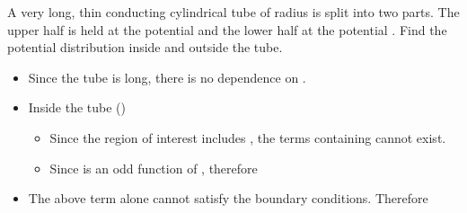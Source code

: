 \begin{ELexample}{}

A very long, thin conducting cylindrical tube of radius  is split into two parts. The upper half is held at the potential  and the lower half at the potential . Find the potential distribution inside and outside the tube.


\begin{ELsolution}

\begin{itemize}
\tightlist
\item
  Since the tube is long, there is no dependence on .
\end{itemize}


\begin{itemize}
\tightlist
\item
  Inside the tube ()

  \begin{itemize}
  \tightlist
  \item
    Since the region of interest includes , the terms containing  cannot exist.
  \item
    Since  is an odd function of \ELim{\phi}, therefore
  \end{itemize}
\end{itemize}


\begin{itemize}
\tightlist
\item
  The above term alone cannot satisfy the boundary conditions. Therefore
\end{itemize}



\end{ELsolution}
\end{ELexample}
